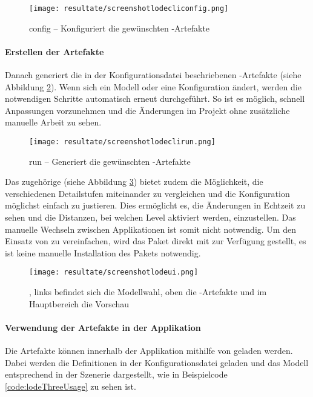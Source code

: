 \begin{figure}[H]
  \centering
  \texttt{[image: resultate/screenshotlodecliconfig.png]}
  \caption{ config – Konfiguriert die gewünschten -Artefakte}
  \label{fig:lodecliconfig}
\end{figure}

\paragraph{Erstellen der Artefakte}
Danach generiert  die in der Konfigurationsdatei beschriebenen -Artefakte (siehe Abbildung \ref{fig:lodeclirun}). Wenn sich ein Modell oder eine Konfiguration ändert, werden die notwendigen Schritte automatisch erneut durchgeführt. So ist es möglich, schnell Anpassungen vorzunehmen und die Änderungen im Projekt ohne zusätzliche manuelle Arbeit zu sehen.

\begin{figure}[H]
  \centering
  \texttt{[image: resultate/screenshotlodeclirun.png]}
  \caption{ run – Generiert die gewünschten -Artefakte}
  \label{fig:lodeclirun}
\end{figure}

Das zugehörige  (siehe Abbildung \ref{fig:lodeui}) bietet zudem die Möglichkeit, die verschiedenen Detailstufen miteinander zu vergleichen und die Konfiguration möglichst einfach zu justieren. Dies ermöglicht es, die Änderungen in Echtzeit zu sehen und die Distanzen, bei welchen Level aktiviert werden, einzustellen. Das manuelle Wechseln zwischen Applikationen ist somit nicht notwendig.
Um den Einsatz von  zu vereinfachen, wird das Paket direkt mit  zur Verfügung gestellt, es ist keine manuelle Installation des Pakets notwendig.

\begin{figure}[H]
  \centering
  \texttt{[image: resultate/screenshotlodeui.png]}
  \caption{, links befindet sich die Modellwahl, oben die -Artefakte und im Hauptbereich die Vorschau}
  \label{fig:lodeui}
\end{figure}

\paragraph{Verwendung der Artefakte in der Applikation}
Die Artefakte können innerhalb der Applikation mithilfe von  geladen werden. Dabei werden die Definitionen in der Konfigurationsdatei geladen und das Modell entsprechend in der Szenerie dargestellt, wie in Beispielcode \ref{code:lodeThreeUsage} zu sehen ist.

